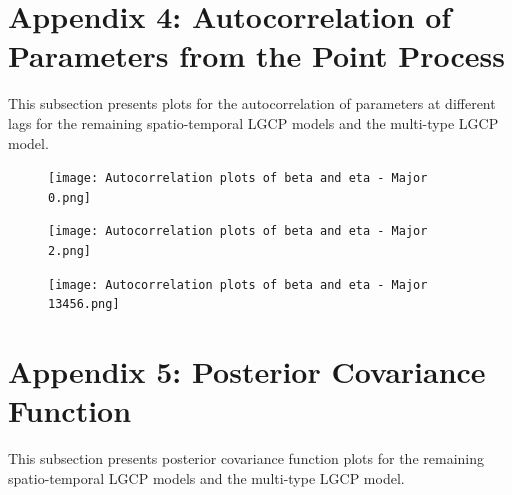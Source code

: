     \newpage
    \clearpage
    
\section*{Appendix 4: Autocorrelation of Parameters from the Point Process} \label{app:point-process}

    This subsection presents plots for the autocorrelation of parameters at different lags for the remaining spatio-temporal LGCP models and the multi-type LGCP model.

    \begin{figure}[h]
        \begin{center}
            \texttt{[image: Autocorrelation plots of beta and eta - Major 0.png]}
        \end{center}
    \end{figure}

    \begin{figure}[H]
        \begin{center}
            \texttt{[image: Autocorrelation plots of beta and eta - Major 2.png]}
        \end{center}
    \end{figure}

    \begin{figure}[H]
        \begin{center}
            \texttt{[image: Autocorrelation plots of beta and eta - Major 13456.png]}
        \end{center}
    \end{figure}

\newpage

\section*{Appendix 5: Posterior Covariance Function} \label{app:covariance-function}

    This subsection presents posterior covariance function plots for the remaining spatio-temporal LGCP models and the multi-type LGCP model.

